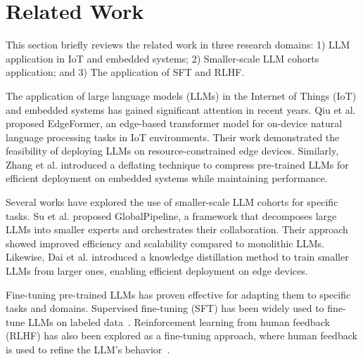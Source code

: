 \section{Related Work}
\label{section:related-work}
This section briefly reviews the related work in three research domains: 1) LLM application in IoT and embedded systems; 2) Smaller-scale LLM cohorts application; and 3) The application of SFT and RLHF.

The application of large language models (LLMs) in the Internet of Things (IoT) and embedded systems has gained significant attention in recent years. Qiu et al.\cite{qiu2022edgeformer} proposed EdgeFormer, an edge-based transformer model for on-device natural language processing tasks in IoT environments. Their work demonstrated the feasibility of deploying LLMs on resource-constrained edge devices. Similarly, Zhang et al.\cite{zhang2022deflating} introduced a deflating technique to compress pre-trained LLMs for efficient deployment on embedded systems while maintaining performance.

Several works have explored the use of smaller-scale LLM cohorts for specific tasks. Su et al.\cite{su2022globalpipeline} proposed GlobalPipeline, a framework that decomposes large LLMs into smaller experts and orchestrates their collaboration. Their approach showed improved efficiency and scalability compared to monolithic LLMs. Likewise, Dai et al.\cite{dai2022knowledge} introduced a knowledge distillation method to train smaller LLMs from larger ones, enabling efficient deployment on edge devices.

Fine-tuning pre-trained LLMs has proven effective for adapting them to specific tasks and domains. Supervised fine-tuning (SFT) has been widely used to fine-tune LLMs on labeled data~\cite{gao2021making,lee2022deduplicating}. Reinforcement learning from human feedback (RLHF) has also been explored as a fine-tuning approach, where human feedback is used to refine the LLM's behavior~\cite{stiennon2020learning,ouyang2022training}.